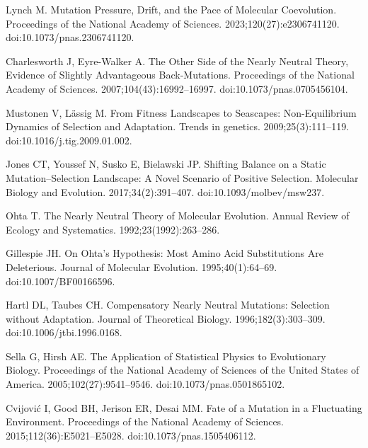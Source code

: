 \documentclass[10pt,letterpaper]{article}
\begin{document}
\begin{thebibliography}{10}
Lynch M.
\newblock Mutation Pressure, Drift, and the Pace of Molecular Coevolution.
\newblock Proceedings of the National Academy of Sciences.
2023;120(27):e2306741120.
\newblock doi:{10.1073/pnas.2306741120}.

Charlesworth J, {Eyre-Walker} A.
\newblock The Other Side of the Nearly Neutral Theory, Evidence of Slightly
Advantageous Back-Mutations.
\newblock Proceedings of the National Academy of Sciences.
2007;104(43):16992--16997.
\newblock doi:{10.1073/pnas.0705456104}.

Mustonen V, L{\"a}ssig M.
\newblock From Fitness Landscapes to Seascapes: Non-Equilibrium Dynamics of
Selection and Adaptation.
\newblock Trends in genetics. 2009;25(3):111--119.
\newblock doi:{10.1016/j.tig.2009.01.002}.

Jones CT, Youssef N, Susko E, Bielawski JP.
\newblock Shifting Balance on a Static Mutation--Selection Landscape: A Novel
Scenario of Positive Selection.
\newblock Molecular Biology and Evolution. 2017;34(2):391--407.
\newblock doi:{10.1093/molbev/msw237}.

Ohta T.
\newblock The Nearly Neutral Theory of Molecular Evolution.
\newblock Annual Review of Ecology and Systematics. 1992;23(1992):263--286.

Gillespie JH.
\newblock On {{Ohta}}'s Hypothesis: {{Most}} Amino Acid Substitutions Are
Deleterious.
\newblock Journal of Molecular Evolution. 1995;40(1):64--69.
\newblock doi:{10.1007/BF00166596}.

Hartl DL, Taubes CH.
\newblock Compensatory Nearly Neutral Mutations: {{Selection}} without
Adaptation.
\newblock Journal of Theoretical Biology. 1996;182(3):303--309.
\newblock doi:{10.1006/jtbi.1996.0168}.

Sella G, Hirsh AE.
\newblock The Application of Statistical Physics to Evolutionary Biology.
\newblock Proceedings of the National Academy of Sciences of the United States
of America. 2005;102(27):9541--9546.
\newblock doi:{10.1073/pnas.0501865102}.

Cvijovi{\'c} I, Good BH, Jerison ER, Desai MM.
\newblock Fate of a Mutation in a Fluctuating Environment.
\newblock Proceedings of the National Academy of Sciences.
2015;112(36):E5021--E5028.
\newblock doi:{10.1073/pnas.1505406112}.


\end{thebibliography}
\end{document}
